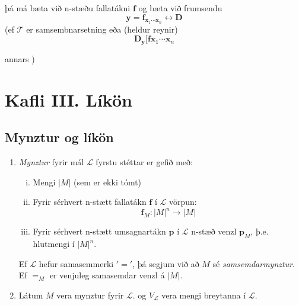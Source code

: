 \documentclass[12pt]{book}
\begin{document}
þá má bæta við n-stæðu fallatákni $\mathbf{f}$ og bæta við frumsendu
\[ \mathbf{y} = \mathbf{f}_{\mathbf{x}_1 \dotsb \mathbf{x}_n} \leftrightarrow \mathbf{D} \]
(ef $\mathcal{T}$ er samsembnarsetning eða (heldur reynir)
\[ \mathbf{D}_{\mathbf{y}} [\mathbf{f} \mathbf{x}_1 \dotsb \mathbf{x}_n \]

annars )


\chapter{Kafli III. Líkön}

\section{Mynztur og líkön}

\begin{skgr}
  \begin{enumerate}[(1)]
  \item  \emph{Mynztur} fyrir mál \(\mathcal{L} \) fyrstu stéttar er gefið með:
    \begin{enumerate}[(i)]
    \item  Mengi \(|M| \) (sem er ekki tómt)
    \item  Fyrir sérhvert n-stætt fallatákn \(\mathbf{f}\) í \(\mathcal{L}\)
       vörpun: 
       \[ \mathbf{f}_{M}: |M|^n \rightarrow |M| \]
     \item Fyrir sérhvert n-stætt umsagnartákn \(\mathbf{p} \) í \(\mathcal{L}\)
       n-stæð venzl $\mathbf{p}_{M}$, þ.e. hlutmengi í $|M|^{n}$.
    \end{enumerate}
    Ef $\mathcal{L}$ hefur samasemmerki $'='$, þá segjum við að $M$ sé 
    \emph{samsemdarmynztur}. Ef $=_{M}$ er venjuleg samasemdar venzl á $|M|$.
  \item Látum $M$ vera mynztur fyrir $\mathcal{L}$. og $V_{\mathcal{L}}$ vera mengi breytanna í $\mathcal{L}$.


\end{enumerate}
\end{skgr}
\end{document}
